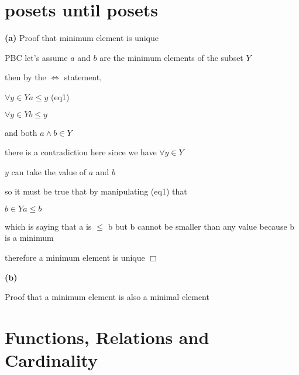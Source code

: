 \documentclass[12pts,A4]{article}
\begin{document}
\section{posets until posets}
\begin{flushleft}

        
    \textbf{(a)}
    Proof that minimum element is unique

    PBC let's assume $a$ and $b$ are the minimum elements of the subset $Y$

    then by the $\iff$ statement,
    
    $\forall y \in Y a \leq y $ (eq1) 

    $\forall y \in Y b \leq y $ 
    
    and both $ a \wedge b \in Y$

    there is a contradiction here since we have $\forall y \in Y$
    
    $y$ can take the value of $ a$ and $b$

    so it must be true that by manipulating (eq1) that
    
    $ b \in Y a \leq b $

    which is saying that a is $\leq$ b
    but b cannot be smaller than any value because b is a minimum 

    \bigskip

    therefore a minimum element is unique $\Box$

    \textbf{(b)}

    Proof that a minimum element is also a minimal element

    
\end{flushleft}


\section{Functions, Relations and Cardinality}
\end{document}
